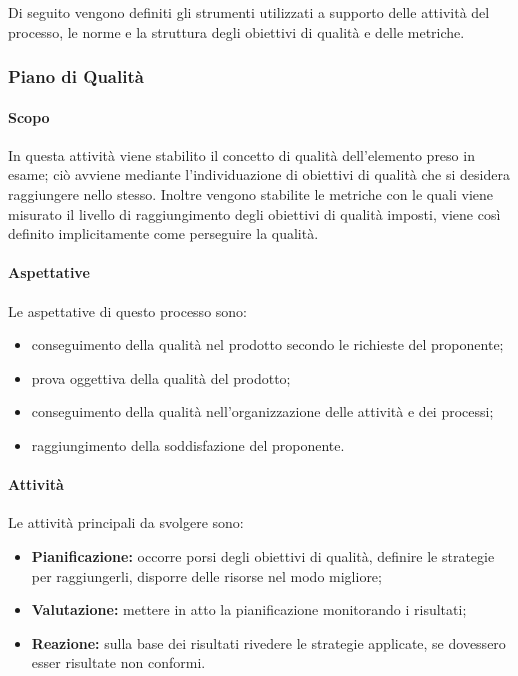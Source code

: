 Di seguito vengono definiti gli strumenti utilizzati a supporto delle attività del processo, le norme e la struttura
degli obiettivi di qualità e delle metriche.

\subsubsection{Piano di Qualità}
\label{ssub:pianificazione_qualita}

\paragraph{Scopo}

In questa attività viene stabilito il concetto di qualità dell'elemento preso in esame; ciò avviene mediante l'individuazione di obiettivi
di qualità che si desidera raggiungere nello stesso. Inoltre vengono stabilite le metriche con le quali viene misurato il livello di
raggiungimento degli obiettivi di qualità imposti, viene così definito implicitamente come perseguire la qualità.

\paragraph{Aspettative}
Le aspettative di questo processo sono:
\begin{itemize}
    \item conseguimento della qualità nel prodotto secondo le richieste del proponente;
    \item prova oggettiva della qualità del prodotto;
    \item conseguimento della qualità nell'organizzazione delle attività e dei processi;
    \item raggiungimento della soddisfazione del proponente.
\end{itemize}

\paragraph{Attività}
Le attività principali da svolgere sono:
\begin{itemize}
    \item \textbf{Pianificazione:} occorre porsi degli obiettivi di qualità, definire le strategie per raggiungerli, disporre delle risorse nel modo migliore;
    \item \textbf{Valutazione:} mettere in atto la pianificazione monitorando i risultati;
    \item \textbf{Reazione:} sulla base dei risultati rivedere le strategie applicate, se dovessero esser risultate non conformi.
\end{itemize}

